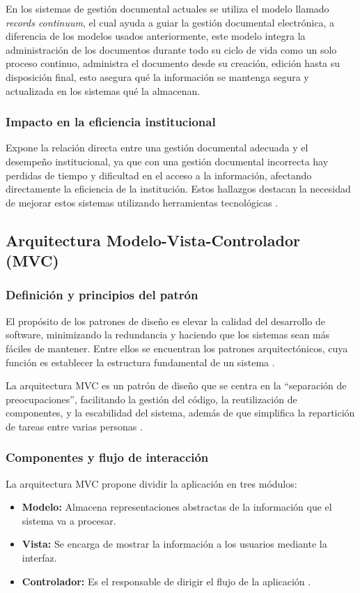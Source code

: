 En los sistemas de gestión documental actuales se utiliza el modelo llamado \textit{records continuum}, el cual ayuda a guiar la gestión documental electrónica, a diferencia de los modelos usados anteriormente, este modelo integra la administración de los documentos durante todo su ciclo de vida como un solo proceso continuo, administra el documento desde su creación, edición hasta su disposición final, esto asegura qué la información se mantenga segura y actualizada en los sistemas qué la almacenan.

\subsubsection{Impacto en la eficiencia institucional}
\cite{gestionDocGloriaAguirre} Expone la relación directa entre una gestión documental adecuada y el desempeño institucional, ya que con una gestión documental incorrecta hay perdidas de tiempo y dificultad en el acceso a la información, afectando directamente la eficiencia de la institución. Estos hallazgos destacan la necesidad de mejorar estos sistemas utilizando herramientas tecnológicas .

\subsection{Arquitectura Modelo-Vista-Controlador (MVC)}
\label{sec:marco_teorico_tema2}
\subsubsection{Definición y principios del patrón}
El propósito de los patrones de diseño es elevar la calidad del desarrollo de software, minimizando la redundancia y haciendo que los sistemas sean más fáciles de mantener. Entre ellos se encuentran los patrones arquitectónicos, cuya función es establecer la estructura fundamental de un sistema \cite{MVCFranklin}. 

La arquitectura MVC es un patrón de diseño que se centra en la ``separación de preocupaciones'', facilitando la gestión del código, la reutilización de componentes, y la escabilidad del sistema, además de que simplifica la repartición de tareas entre varias personas \cite{MVCpreprints}.

\subsubsection{Componentes y flujo de interacción}
La arquitectura MVC propone dividir la aplicación en tres módulos:
\begin{itemize}
    \item \textbf{Modelo:} Almacena representaciones abstractas de la información que el sistema va a procesar.
    \item \textbf{Vista:} Se encarga de mostrar la información a los usuarios mediante la interfaz.
    \item \textbf{Controlador:} Es el responsable de dirigir el flujo de la aplicación \cite{MVCFranklin}.
\end{itemize}

